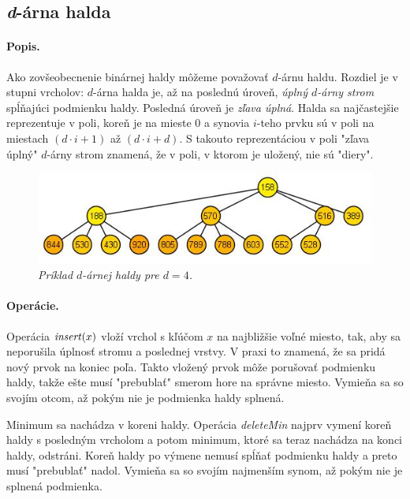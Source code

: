 \def\find{\mathop{\mathit{find}}}
\def\delete{\mathop{\mathit{delete}}}

\subsection{\emph{d}-árna halda} 
\paragraph{Popis.}
Ako zovšeobecnenie binárnej haldy môžeme považovať $d$-árnu haldu. Rozdiel je v stupni vrcholov:
$d$-árna halda je, až na poslednú úroveň, \emph{úplný $d$-árny strom} spĺňajúci podmienku haldy. Posledná úroveň je 
\emph{zľava úplná}.
Halda sa najčastejšie reprezentuje v poli, koreň je na mieste $0$ a synovia $i$-teho prvku sú v poli na miestach 
$(d\cdot i + 1)$ až $(d\cdot i + d)$.
S takouto reprezentáciou v poli "zľava úplný" $d$-árny strom znamená, že v poli, v ktorom je uložený, nie sú "diery". 

\begin{figure}
\includegraphics[width=\columnwidth]{obrazky/daryheap.png}
\caption{\emph{Príklad $d$-árnej haldy pre $d = 4$.}} 
\label{img:komp} 
\end{figure}

\paragraph{Operácie.}
Operácia $\mathop{\mathit{insert}}(x)$ vloží vrchol s kľúčom $x$ na najbližšie voľné miesto, tak, aby sa neporušila úplnosť stromu 
a poslednej vrstvy. V praxi to znamená, že sa pridá nový prvok na koniec poľa. Takto vložený prvok môže porušovať 
podmienku haldy, takže ešte musí "prebublať" smerom hore na správne miesto. Vymieňa sa so svojím otcom, až pokým 
nie je podmienka haldy splnená.

Minimum sa nachádza v koreni haldy. Operácia \emph{deleteMin} najprv vymení koreň haldy s posledným vrcholom a potom 
minimum, ktoré sa teraz nachádza na konci haldy, odstráni. Koreň haldy po výmene nemusí spĺňať podmienku haldy a 
preto musí "prebublať" nadol. Vymieňa sa so svojím najmenším synom, až pokým nie je splnená podmienka.

